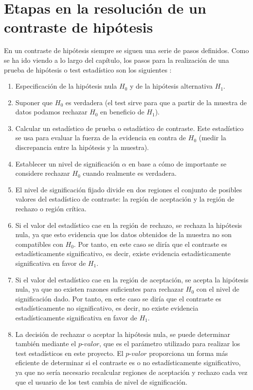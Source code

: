 \section{Etapas en la resolución de un contraste de hipótesis}
En un contraste de hipótesis siempre se siguen una serie de pasos definidos. Como se ha ido viendo a lo largo
del capítulo, los pasos para la realización de una prueba de hipótesis o test estadístico son los siguientes
\cite{libro}:
\begin{enumerate}
\item Especificación de la hipótesis nula $H_0$ y de la hipótesis alternativa $H_1$.
\item Suponer que $H_0$ es verdadera (el test sirve para que a partir de la muestra de datos podamos rechazar
$H_0$ en beneficio de $H_1$).
\item Calcular un estadístico de prueba o estadístico de contraste. Este estadístico se usa para evaluar la
fuerza de la evidencia en contra de $H_0$ (medir la discrepancia entre la hipótesis y la muestra).
\item Establecer un nivel de significación $\alpha$ en base a cómo de importante se considere rechazar $H_0$
cuando realmente es verdadera.
\item El nivel de significación fijado divide en dos regiones el conjunto de posibles valores del estadístico
de contraste: la región de aceptación y la región de rechazo o región crítica.
\item Si el valor del estadístico cae en la región de rechazo, se rechaza la hipótesis nula, ya que esto
evidencia que los datos obtenidos de la muestra no son compatibles con $H_0$. Por tanto, en este caso se diría
que el contraste es estadísticamente significativo, es decir, existe evidencia estadísticamente significativa en
favor de $H_1$.
\item Si el valor del estadístico cae en la región de aceptación, se acepta la hipótesis nula, ya que no existen
razones suficientes para rechazar $H_0$ con el nivel de significación dado. Por tanto, en este caso se diría
que el contraste es estadísticamente no significativo, es decir, no existe evidencia estadísticamente significativa
en favor de $H_1$.
\item La decisión de rechazar o aceptar la hipótesis nula, se puede determinar también mediante el $\textit{p-valor}$,
que es el parámetro utilizado para realizar los test estadísticos en este proyecto. El $\textit{p-valor}$ proporciona
un forma más eficiente de determinar si el contraste es o no estadísticamente significativo, ya que no sería
necesario recalcular regiones de aceptación y rechazo cada vez que el usuario de los test cambia de nivel de
significación.
\end{enumerate}

